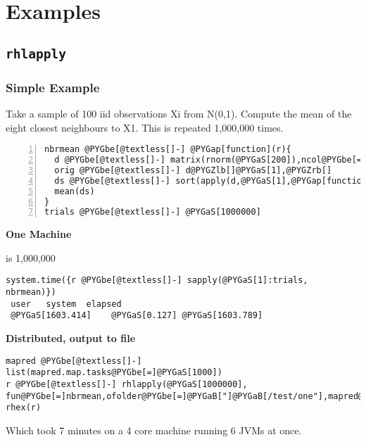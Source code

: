 \documentclass[letterpaper,10pt,english]{manual}
\begin{document}
\resetcurrentobjects
\hypertarget{--doc-examples}{}

\chapter{Examples}


\section{\texttt{rhlapply}}


\subsection{Simple Example}

Take a sample of 100 iid observations Xi from N(0,1). Compute the mean of the eight closest neighbours to X1. This is repeated 1,000,000 times.

\begin{Verbatim}[commandchars=@\[\],numbers=left,firstnumber=1,stepnumber=1]
nbrmean @PYGbe[@textless[]-] @PYGap[function](r){
  d @PYGbe[@textless[]-] matrix(rnorm(@PYGaS[200]),ncol@PYGbe[=]@PYGaS[2])
  orig @PYGbe[@textless[]-] d@PYGZlb[]@PYGaS[1],@PYGZrb[]
  ds @PYGbe[@textless[]-] sort(apply(d,@PYGaS[1],@PYGap[function](r) sqrt(sum((r@PYGbe[-]orig)@PYGbe[@textasciicircum[]]@PYGaS[2])))@PYGZlb[]@PYGaS[-1]@PYGZrb[])@PYGZlb[]@PYGaS[1]:@PYGaS[8]@PYGZrb[]
  mean(ds)
}
trials @PYGbe[@textless[]-] @PYGaS[1000000]
\end{Verbatim}

\textbf{One Machine}

 is 1,000,000

\begin{Verbatim}[commandchars=@\[\]]
system.time({r @PYGbe[@textless[]-] sapply(@PYGaS[1]:trials, nbrmean)})
 user   system  elapsed
 @PYGaS[1603.414]    @PYGaS[0.127] @PYGaS[1603.789]
\end{Verbatim}

\textbf{Distributed, output to file}

\begin{Verbatim}[commandchars=@\[\]]
mapred @PYGbe[@textless[]-] list(mapred.map.tasks@PYGbe[=]@PYGaS[1000])
r @PYGbe[@textless[]-] rhlapply(@PYGaS[1000000], fun@PYGbe[=]nbrmean,ofolder@PYGbe[=]@PYGaB["]@PYGaB[/test/one"],mapred@PYGbe[=]mapred)
rhex(r)
\end{Verbatim}

Which took 7 minutes on a 4 core machine running 6 JVMs at once.
\end{document}
